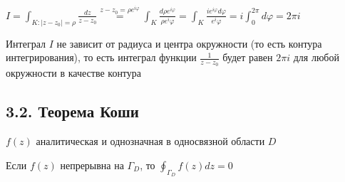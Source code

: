 \documentclass[12pt]{article}
\begin{document}
\Ex $I = \int_{K : |z - z_0| = \rho} \frac{dz}{z - z_0} \overset{z - z_0 = \rho e^{i\varphi}}{=} \int_K \frac{d\rho e^{i\varphi}}{\rho e^i\varphi} = 
\int_K \frac{i e^{i\varphi} d\varphi}{e^i\varphi} = i \int_0^{2\pi} d\varphi = 2\pi i$

Интеграл $I$ не зависит от радиуса и центра окружности (то есть контура интегрирования), то есть
интеграл функции $\frac{1}{z - z_0}$ будет равен $2\pi i$ для любой окружности в качестве контура 

\subsection{3.2. Теорема Коши}

\hypertarget{cauchy_for_simply_connected_space}{}

\begin{MyTheorem}
     $f(z)$ аналитическая и однозначная в односвязной области $D$

    Если $f(z)$ непрерывна на $\Gamma_D$, то $\oint_{\Gamma_D} f(z) dz = 0$
\end{MyTheorem}
\end{document}
